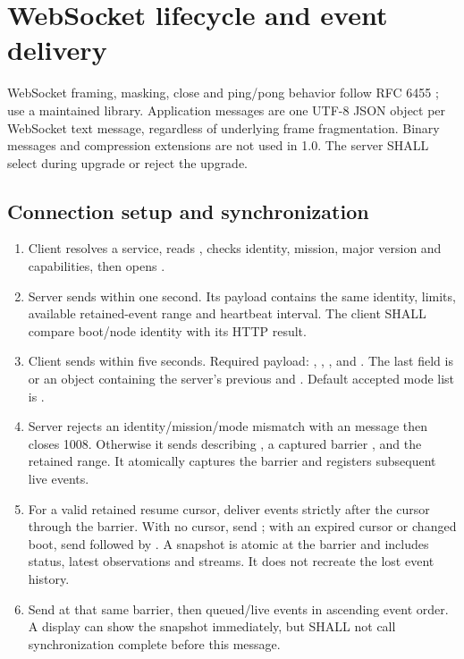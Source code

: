 \section{WebSocket lifecycle and event delivery}\label{sec:events}
WebSocket framing, masking, close and ping/pong behavior follow RFC 6455
\cite{websocket}; use a maintained library. Application messages are one UTF-8
JSON object per WebSocket text message, regardless of underlying frame
fragmentation. Binary messages and compression extensions are not used in 1.0.
The server SHALL select  during upgrade or reject the upgrade.

\subsection{Connection setup and synchronization}
\begin{enumerate}
\item Client resolves a service, reads , checks identity, mission,
major version and capabilities, then opens .
\item Server sends  within one second. Its payload contains the
same identity, limits, available retained-event range and heartbeat interval.
The client SHALL compare boot/node identity with its HTTP result.
\item Client sends  within five seconds. Required payload:
, , ,
 and . The last field is 
or an object containing the server's previous  and
. Default accepted mode list is \code{["live"]}.
\item Server rejects an identity/mission/mode mismatch with an 
message then closes 1008. Otherwise it sends  describing
, a captured barrier , and the retained
range. It atomically captures the barrier and registers subsequent live events.
\item For a valid retained resume cursor, deliver events strictly after the
cursor through the barrier. With no cursor, send ; with an expired
cursor or changed boot, send  followed by . A snapshot
is atomic at the barrier and includes status, latest observations and streams.
It does not recreate the lost event history.
\item Send  at that same barrier, then queued/live events
in ascending event order. A display can show the snapshot immediately, but SHALL
not call synchronization complete before this message.
\end{enumerate}

